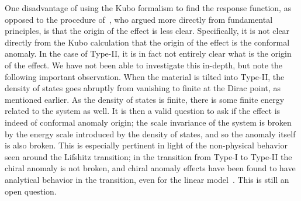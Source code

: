 One disadvantage of using the Kubo formalism to find the response function, as opposed to the procedure of~\textcite{chernodubGenerationNernstCurrent2018}, who argued more directly from fundamental principles, is that the origin of the effect is less clear.
Specifically, it is not clear directly from the Kubo calculation that the origin of the effect is the conformal anomaly.
In the case of Type-II, it is in fact not entirely clear what is the origin of the effect.
We have not been able to investigate this in-depth, but note the following important observation.
When the material is tilted into Type-II, the density of states goes abruptly from vanishing to finite at the Dirac point, as mentioned earlier.
As the density of states is finite, there is some finite energy related to the system as well.
It is then a valid question to ask if the effect is indeed of conformal anomaly origin;
the scale invariance of the system is broken by the energy scale introduced by the density of states, and so the anomaly itself is also broken.
This is especially pertinent in light of the non-physical behavior seen around the Lifshitz transition;
in the transition from Type-I to Type-II the chiral anomaly is not broken, and chiral anomaly effects have been found to have analytical behavior in the transition, even for the linear model~\cite{sharmaChiralAnomalyLongitudinal2017}.
This is still an open question.


